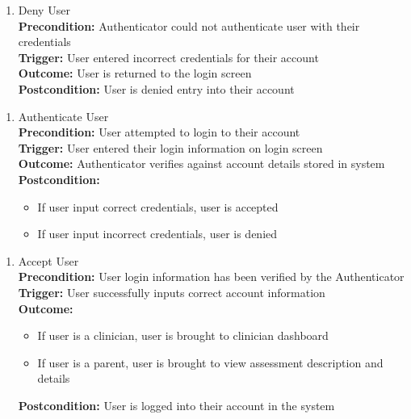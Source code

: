 \documentclass[12pt]{article}
\begin{document}
\begin{enumerate}[label={PUC-}06. ]
  \item Deny User\\
  \textbf{Precondition: }Authenticator could not authenticate user with their credentials\\
  \textbf{Trigger: }User entered incorrect credentials for their account\\
  \textbf{Outcome: }User is returned to the login screen\\
  \textbf{Postcondition: }User is denied entry into their account\\
\end{enumerate}

\begin{enumerate}[label={PUC-}07. ]
  \item Authenticate User\\
  \textbf{Precondition: }User attempted to login to their account\\
  \textbf{Trigger: }User entered their login information on login screen\\
  \textbf{Outcome: }Authenticator verifies against account details stored in system\\
  \textbf{Postcondition: }
  \begin{itemize}
    \item If user input correct credentials, user is accepted
    \item If user input incorrect credentials, user is denied
  \end{itemize}
\end{enumerate}

\begin{enumerate}[label={PUC-}08. ]
  \item Accept User\\
  \textbf{Precondition: }User login information has been verified by the Authenticator\\
  \textbf{Trigger: }User successfully inputs correct account information\\
  \textbf{Outcome: }
  \begin{itemize}
    \item If user is a clinician, user is brought to clinician dashboard
    \item If user is a parent, user is brought to view assessment description and details
  \end{itemize}
\textbf{Postcondition: }User is logged into their account in the system\\
\end{enumerate}
\end{document}
